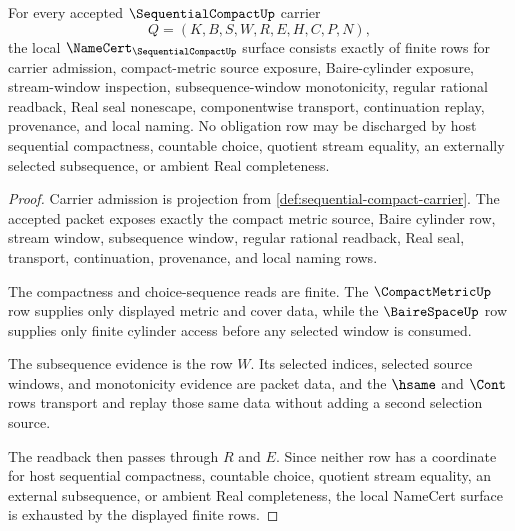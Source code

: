 \begin{theorem}
\label{thm:sequential-compact-namecert-obligations}
For every accepted $\SequentialCompactUp$ carrier
$$
Q=(K,B,S,W,R,E,H,C,P,N),
$$
the local $\NameCert_{\SequentialCompactUp}$ surface consists exactly of finite rows for carrier admission, compact-metric source exposure, Baire-cylinder exposure, stream-window inspection, subsequence-window monotonicity, regular rational readback, Real seal nonescape, componentwise transport, continuation replay, provenance, and local naming. No obligation row may be discharged by host sequential compactness, countable choice, quotient stream equality, an externally selected subsequence, or ambient Real completeness.
\end{theorem}
\begin{proof}
Carrier admission is projection from \autoref{def:sequential-compact-carrier}. The accepted packet exposes exactly the compact metric source, Baire cylinder row, stream window, subsequence window, regular rational readback, Real seal, transport, continuation, provenance, and local naming rows.

The compactness and choice-sequence reads are finite. The $\CompactMetricUp$ row supplies only displayed metric and cover data, while the $\BaireSpaceUp$ row supplies only finite cylinder access before any selected window is consumed.

The subsequence evidence is the row $W$. Its selected indices, selected source windows, and monotonicity evidence are packet data, and the $\hsame$ and $\Cont$ rows transport and replay those same data without adding a second selection source.

The readback then passes through $R$ and $E$. Since neither row has a coordinate for host sequential compactness, countable choice, quotient stream equality, an external subsequence, or ambient Real completeness, the local NameCert surface is exhausted by the displayed finite rows.
\end{proof}

